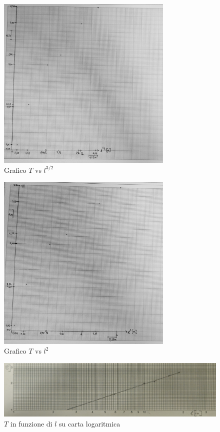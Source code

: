 \documentclass[a4paper]{article}
\begin{document}
\begin{figure}[!h]
    \centering
    \includegraphics[width=0.75\textwidth]{fotopendolo/lunghezza32.jpg}
    \caption{Grafico $T$ vs $l^{3/2}$}
\end{figure}

\begin{figure}[!h]
    \centering
    \includegraphics[width=0.75\textwidth]{fotopendolo/lunghezza21.jpg}
    \caption{Grafico $T$ vs $l^2$}
\end{figure}
\begin{figure}[!h]
    \centering
    \includegraphics[width=\textwidth]{fotopendolo/loglog.jpg}
    \caption{$T$ in funzione di $l$ su carta logaritmica}
\end{figure}
\end{document}

